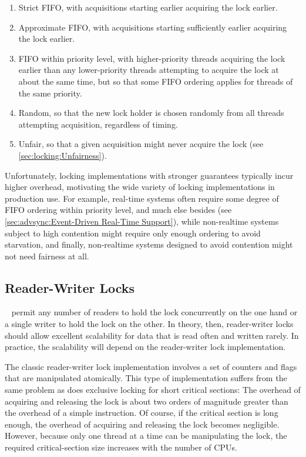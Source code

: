 \begin{enumerate}
\item	Strict FIFO, with acquisitions starting earlier acquiring
	the lock earlier.
\item	Approximate FIFO, with acquisitions starting sufficiently
	earlier acquiring the lock earlier.
\item	FIFO within priority level, with higher-priority threads
	acquiring the lock earlier than any lower-priority threads
	attempting to acquire the lock at about the same time, but so
	that some FIFO ordering applies for threads of the same priority.
\item	Random, so that the new lock holder is chosen randomly from
	all threads attempting acquisition, regardless of timing.
\item
	Unfair, so that a given acquisition might never acquire the lock
	(see \cref{sec:locking:Unfairness}).
\end{enumerate}

Unfortunately, locking implementations with stronger guarantees
typically incur higher overhead, motivating the wide variety of locking
implementations in production use.
For example, real-time systems often require some degree of FIFO
ordering within priority level, and much else besides
(see \cref{sec:advsync:Event-Driven Real-Time Support}),
while non-realtime systems subject to high contention might require
only enough ordering to avoid starvation, and finally, non-realtime
systems designed to avoid contention might not need fairness at all.

\subsection{Reader-Writer Locks}
\label{sec:locking:Reader-Writer Locks}

~\cite{Courtois71}
permit any number of readers to hold the lock
concurrently on the one hand or a single writer to hold the lock
on the other.
In theory, then, reader-writer locks should allow excellent scalability
for data that is read often and written rarely.
In practice, the scalability will depend on the reader-writer lock
implementation.

The classic reader-writer lock implementation involves a set of
counters and flags that are manipulated atomically.
This type of implementation suffers from the same problem as does
exclusive locking for short critical sections:
The overhead of acquiring and releasing the lock
is about two orders of magnitude greater than the overhead
of a simple instruction.
Of course, if the critical section is long enough, the overhead of
acquiring and releasing the lock becomes negligible.
However, because only
one thread at a time can be manipulating the lock, the required
critical-section size increases with the number of CPUs.

